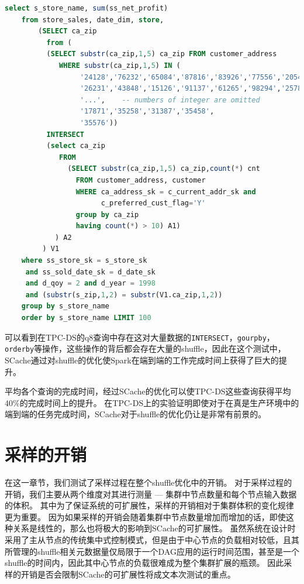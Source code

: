 \begin{lstlisting}[language={SQL}, caption={TCP-DS的q8查询代码片段}, label={code:tpcq8}]
    select s_store_name, sum(ss_net_profit)
    from store_sales, date_dim, store,
        (SELECT ca_zip
          from (
          (SELECT substr(ca_zip,1,5) ca_zip FROM customer_address
             WHERE substr(ca_zip,1,5) IN (
                  '24128','76232','65084','87816','83926','77556','20548',
                  '26231','43848','15126','91137','61265','98294','25782',
                  '...',    -- numbers of integer are omitted
                  '17871','35258','31387','35458',
                  '35576'))
          INTERSECT
          (select ca_zip
             FROM
               (SELECT substr(ca_zip,1,5) ca_zip,count(*) cnt
                 FROM customer_address, customer
                 WHERE ca_address_sk = c_current_addr_sk and
                       c_preferred_cust_flag='Y'
                 group by ca_zip
                 having count(*) > 10) A1)
            ) A2
         ) V1
    where ss_store_sk = s_store_sk
     and ss_sold_date_sk = d_date_sk
     and d_qoy = 2 and d_year = 1998
     and (substr(s_zip,1,2) = substr(V1.ca_zip,1,2))
    group by s_store_name
    order by s_store_name LIMIT 100
\end{lstlisting}

可以看到在TPC-DS的q8查询中存在这对大量数据的\verb|INTERSECT|，\verb|gourpby|，\verb|orderby|等操作，这些操作的背后都会存在大量的shuffle，因此在这个测试中，SCache通过对shuffle的优化使Spark在端到端的工作完成时间上获得了巨大的提升。

平均各个查询的完成时间，经过SCache的优化可以使TPC-DS这些查询获得平均40\%的完成时间上的提升。
在TPC-DS上的实验证明即使对于在真是生产环境中的端到端的任务完成时间，SCache对于shuffle的优化仍让是非常有前景的。

\section{采样的开销}

在这一章节，我们测试了采样过程在整个shuffle优化中的开销。
对于采样过程的开销，我们主要从两个维度对其进行测量 --- 集群中节点数量和每个节点输入数据的体积。
其中为了保证系统的可扩展性，采样的开销相对于集群体积的变化规律更为重要。
因为如果采样的开销会随着集群中节点数量增加而增加的话，即使这种关系是线性的，那么也将极大的影响到SCache的可扩展性。
虽然系统在设计时采用了主从节点的传统集中式控制模式，但是由于中心节点的负载相对较低，且其所管理的shuffle相关元数据量仅局限于一个DAG应用的运行时间范围，甚至是一个shuffle的时间内，因此其中心节点的负载很难成为整个集群扩展的瓶颈。
因此采样的开销是否会限制SCache的可扩展性将成文本次测试的重点。

